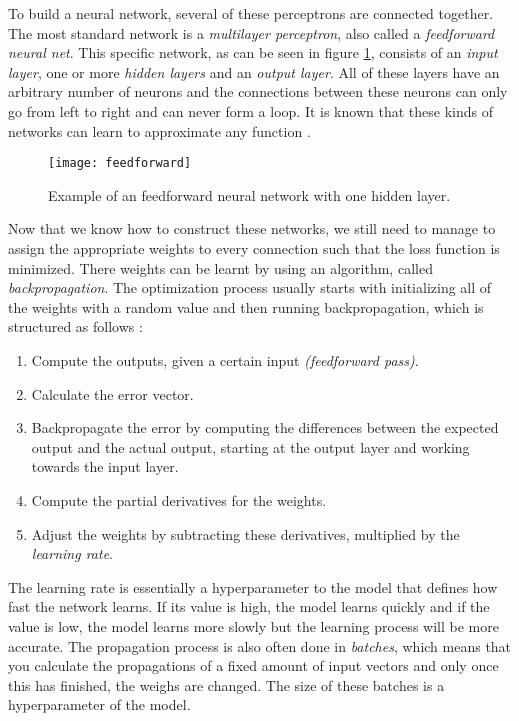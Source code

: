 To build a neural network, several of these perceptrons are connected together.
The most standard network is a \textit{multilayer perceptron}, also called a \textit{feedforward neural net}.
This specific network, as can be seen in figure \ref{fig:feedforward}, consists of an \textit{input layer}, one or more \textit{hidden layers} and an \textit{output layer}.
All of these layers have an arbitrary number of neurons and the connections between these neurons can only go from left to right and can never form a loop.
It is known that these kinds of networks can learn to approximate any function \cite{valiant2014learning}.

\begin{figure}[ht]
  \centering
  \texttt{[image: feedforward]}
  \caption{Example of an feedforward neural network with one hidden layer.}
  \label{fig:feedforward}
\end{figure}

Now that we know how to construct these networks, we still need to manage to assign the appropriate weights to every connection such that the loss function is minimized.
There weights can be learnt by using an algorithm, called \textit{backpropagation}.
The optimization process usually starts with initializing all of the weights with a random value and then running backpropagation, which is structured as follows \cite{nielsen_2017}:
\begin{enumerate}
  \item Compute the outputs, given a certain input \textit{(feedforward pass)}.
  \item Calculate the error vector.
  \item Backpropagate the error by computing the differences between the expected output and the actual output, starting at the output layer and working towards the input layer.
  \item Compute the partial derivatives for the weights.
  \item Adjust the weights by subtracting these derivatives, multiplied by the \textit{learning rate}.
\end{enumerate}

The learning rate is essentially a hyperparameter to the model that defines how fast the network learns.
If its value is high, the model learns quickly and if the value is low, the model learns more slowly but the learning process will be more accurate.
The propagation process is also often done in \textit{batches}, which means that you calculate the propagations of a fixed amount of input vectors and only once this has finished, the weighs are changed.
The size of these batches is a hyperparameter of the model.

